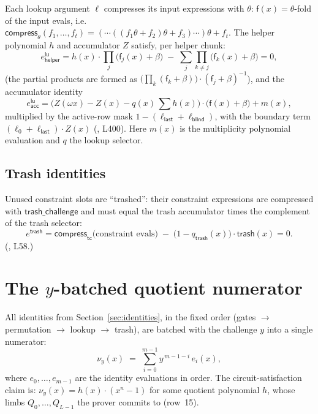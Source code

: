 Each lookup argument $\ell$ compresses its input expressions with
$\theta$: $\mathsf{f}(x) = \theta$-fold of the input evals, i.e.\
$\mathsf{compress}_\theta(f_1,\ldots,f_t) = (\cdots((f_1\theta + f_2)\theta + f_3)\cdots)\theta + f_t$.
The helper polynomial $h$ and accumulator $Z$ satisfy, per helper chunk:
\begin{equation}
  e^{\mathsf{lu}}_{\mathsf{helper}} = h(x)\cdot \prod_{j}\bigl(\mathsf{f}_j(x) + \beta\bigr)
    \;-\; \sum_{j}\prod_{k \neq j}\bigl(\mathsf{f}_k(x) + \beta\bigr) = 0,
  \label{eq:lookup-helper}
\end{equation}
(the partial products are formed as $\bigl(\prod_k (\mathsf{f}_k+\beta)\bigr)
\cdot (\mathsf{f}_j+\beta)^{-1}$), and the accumulator identity
\begin{equation}
  e^{\mathsf{lu}}_{\mathsf{acc}} = \bigl(Z(\omega x) - Z(x) - q(x)\,\textstyle\sum h(x)\bigr)
    \cdot \bigl(\mathsf{f}(x) + \beta\bigr) + m(x),
  \label{eq:lookup-acc}
\end{equation}
multiplied by the active-row mask $1 - (\ell_{\mathsf{last}} + \ell_{\mathsf{blind}})$,
with the boundary term $(\ell_0 + \ell_{\mathsf{last}})\cdot Z(x)$
(\rust{logup.rs::expressions}, L400). Here $m(x)$ is the multiplicity
polynomial evaluation and $q$ the lookup selector.

\subsection{Trash identities}
\label{sec:trash-ident}

Unused constraint slots are ``trashed'': their constraint expressions are
compressed with $\mathsf{trash\_\allowbreak{}challenge}$ and must equal the trash
accumulator times the complement of the trash selector:
\begin{equation}
  e^{\mathsf{trash}} = \mathsf{compress}_{\mathsf{tc}}\bigl(\text{constraint evals}\bigr)
    \;-\; \bigl(1 - q_{\mathsf{trash}}(x)\bigr)\cdot \mathsf{trash}(x) = 0.
  \label{eq:trash}
\end{equation}
(, L58.)

\section{The $y$-batched quotient numerator}
\label{sec:numerator}

All identities from Section~\ref{sec:identities}, in the fixed order
(gates $\to$ permutation $\to$ lookup $\to$ trash), are batched with the
challenge $y$ into a single numerator:
\begin{equation}
  \nu_y(x) \;=\; \sum_{i=0}^{m-1} y^{\,m-1-i}\, e_i(x),
  \label{eq:nu-y}
\end{equation}
where $e_0, \ldots, e_{m-1}$ are the identity evaluations in order. The
circuit-satisfaction claim is: $\nu_y(x) = h(x)\cdot (x^n - 1)$ for some
quotient polynomial $h$, whose limbs $Q_0,\ldots,Q_{L-1}$ the prover
commits to (row~15).

